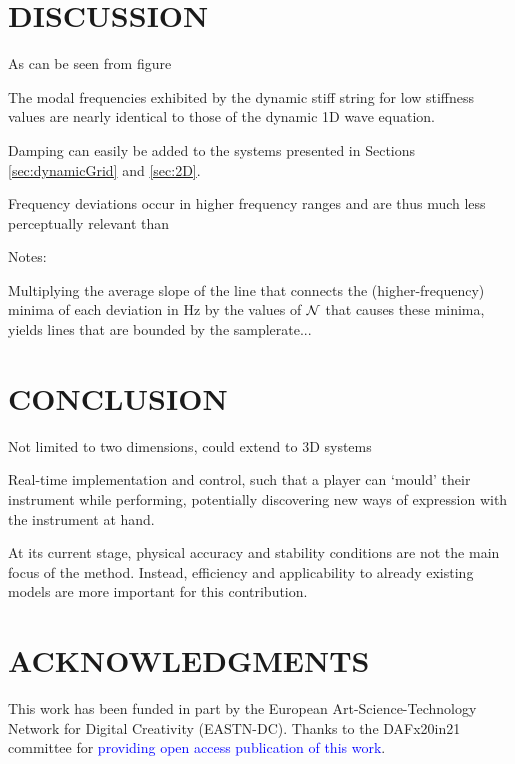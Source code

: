 \documentclass[fleqn]{jaes}
\def\SWcomment[#1]{\textcolor{blue}{#1}}
\begin{document}
\section{DISCUSSION}\label{sec:discussion}
As can be seen from figure 

The modal frequencies exhibited by the dynamic stiff string for low stiffness values are nearly identical to those of the dynamic 1D wave equation.

Damping can easily be added to the systems presented in Sections \ref{sec:dynamicGrid} and \ref{sec:2D}.

Frequency deviations occur in higher frequency ranges and are thus much less perceptually relevant than 

Notes:

Multiplying the average slope of the line that connects the (higher-frequency) minima of each deviation in Hz by the values of $\mathcal{N}$ that causes these minima, yields lines that are bounded by the samplerate...



\section{CONCLUSION}\label{sec:conclusion}
Not limited to two dimensions, could extend to 3D systems

Real-time implementation and control, such that a player can `mould' their instrument while performing, potentially discovering new ways of expression with the instrument at hand.   

At its current stage, physical accuracy and stability conditions are not the main focus of the method. Instead, efficiency and applicability to already existing models are more important for this contribution.


\section{ACKNOWLEDGMENTS}
This  work  has  been  funded  in  part  by  the European Art-Science-Technology Network for Digital Creativity (EASTN-DC). Thanks to the DAFx20in21 committee for \SWcomment[providing open access publication of this work].




\appendix
\end{document}
